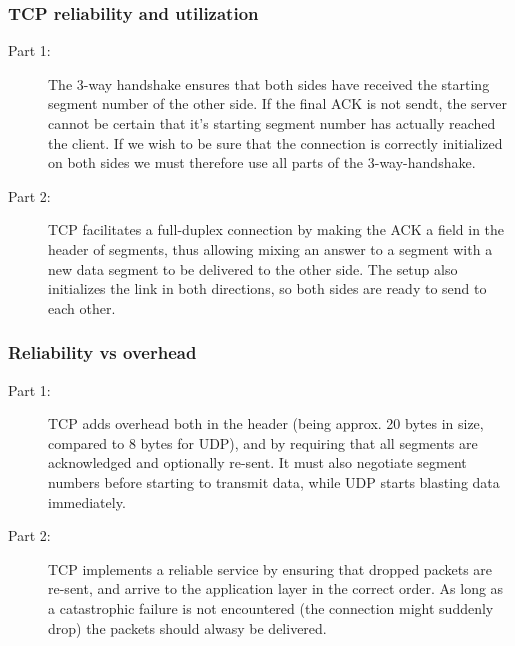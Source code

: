 \subsubsection{TCP reliability and utilization}
\begin{description}
    \item[Part 1:] The 3-way handshake ensures that both sides have received
        the starting segment number of the other side. If the final ACK is not
        sendt, the server cannot be certain that it's starting segment number
        has actually reached the client. If we wish to be sure that the
        connection is correctly initialized on both sides we must therefore use
        all parts of the 3-way-handshake.
    \item[Part 2:] TCP facilitates a full-duplex connection by making the ACK a
        field in the header of segments, thus allowing mixing an answer to a
        segment with a new data segment to be delivered to the other side. The
        setup also initializes the link in both directions, so both sides are
        ready to send to each other.
\end{description}

\subsubsection{Reliability vs overhead}
\begin{description}
    \item[Part 1:] TCP adds overhead both in the header (being approx. 20 bytes
        in size, compared to 8 bytes for UDP), and by requiring that all
        segments are acknowledged and optionally re-sent. It must also
        negotiate segment numbers before starting to transmit data, while UDP
        starts blasting data immediately.
    \item[Part 2:] TCP implements a reliable service by ensuring that dropped
        packets are re-sent, and arrive to the application layer in the correct order.
        As long as a catastrophic failure is not encountered (the connection might
        suddenly drop) the packets should alwasy be delivered.
\end{description}


